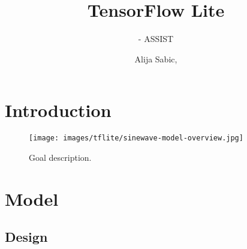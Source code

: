 \documentclass[aspectratio=169]{beamer}
\title[TensorFlow Lite]{TensorFlow Lite}
\subtitle{\glsentrytext{ci} - ASSIST \glsentrytext{heidi}}
\author{Alija Sabic, \glsentrytext{msc}}
\institute{Department Electronic Engineering}
\begin{document}
\begin{frame}[plain]
    \titlepage
\end{frame}

\section{Introduction}

\begin{frame}
    \begin{figure}
        \texttt{[image: images/tflite/sinewave-model-overview.jpg]}
        \caption{Goal description.}
    \end{figure}
\end{frame}

\section{Model}

\subsection{Design}
\end{document}
